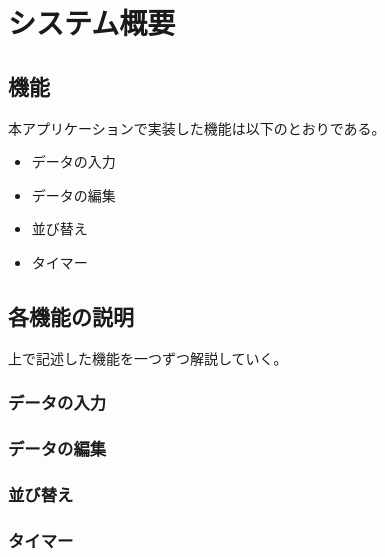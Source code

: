 \chapter{システム概要}
\label{cha:function}

\section{機能}
本アプリケーションで実装した機能は以下のとおりである。

\begin{itemize}
    \item データの入力
    \item データの編集
    \item 並び替え
    \item タイマー
\end{itemize}

\section{各機能の説明}
上で記述した機能を一つずつ解説していく。
\subsection{データの入力}

\subsection{データの編集}
\subsection{並び替え}
\subsection{タイマー}